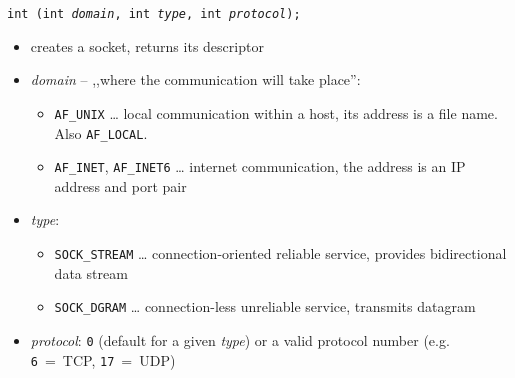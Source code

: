 \begin{slide}
\setlength{\baselineskip}{0.9\baselineskip}
\texttt{int (int \emph{domain}, int \emph{type},
int \emph{protocol});}
\begin{itemize}
\item creates a socket, returns its descriptor
\item \emph{domain} -- ,,where the communication will take place'': 
    \begin{itemize}
    \item \texttt{AF\_UNIX} \dots{} local communication within a host, its
    address is a file name. Also \texttt{AF\_LOCAL}.
    \item \texttt{AF\_INET}, \texttt{AF\_INET6} \dots{} internet communication,
    the address is an IP address and port pair
    \end{itemize}
\item \emph{type}:
    \begin{itemize}
    \item \texttt{SOCK\_STREAM} \dots{} connection-oriented reliable service,
    provides bidirectional data stream
    \item \texttt{SOCK\_DGRAM} \dots{} connection-less unreliable service,
    transmits datagram
    \end{itemize}
\item \emph{protocol}: \texttt{0} (default for a given \emph{type})
or a valid protocol number (e.g. \texttt{6}~=~TCP, \texttt{17}~=~UDP)
\end{itemize}
\end{slide}

\label{SOCKET}

